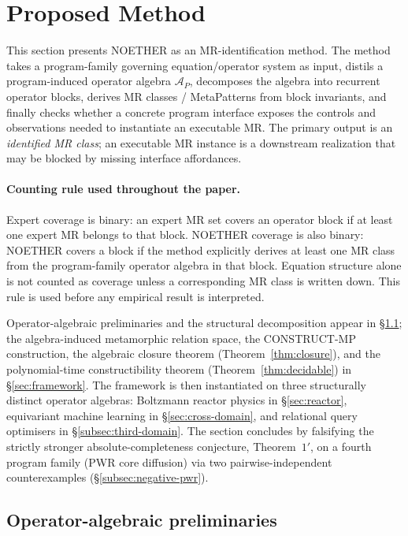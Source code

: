 \documentclass[manuscript]{acmart}
\begin{document}
\section{Proposed Method}
\label{sec:noether-framework}

This section presents NOETHER as an MR-identification method. The method takes a program-family governing equation/operator system as input, distils a program-induced operator algebra $\mathcal{A}_P$, decomposes the algebra into recurrent operator blocks, derives MR classes / MetaPatterns from block invariants, and finally checks whether a concrete program interface exposes the controls and observations needed to instantiate an executable MR. The primary output is an \emph{identified MR class}; an executable MR instance is a downstream realization that may be blocked by missing interface affordances.

\paragraph{Counting rule used throughout the paper.}
Expert coverage is binary: an expert MR set covers an operator block if at least one expert MR belongs to that block. NOETHER coverage is also binary: NOETHER covers a block if the method explicitly derives at least one MR class from the program-family operator algebra in that block. Equation structure alone is not counted as coverage unless a corresponding MR class is written down. This rule is used before any empirical result is interpreted.

Operator-algebraic preliminaries and the structural decomposition appear in \S\ref{sec:prelim}; the algebra-induced metamorphic relation space, the CONSTRUCT-MP construction, the algebraic closure theorem (Theorem~\ref{thm:closure}), and the polynomial-time constructibility theorem (Theorem~\ref{thm:decidable}) in \S\ref{sec:framework}. The framework is then instantiated on three structurally distinct operator algebras: Boltzmann reactor physics in \S\ref{sec:reactor}, equivariant machine learning in \S\ref{sec:cross-domain}, and relational query optimisers in \S\ref{subsec:third-domain}. The section concludes by falsifying the strictly stronger absolute-completeness conjecture, Theorem~$1'$, on a fourth program family (PWR core diffusion) via two pairwise-independent counterexamples (\S\ref{subsec:negative-pwr}).

\subsection{Operator-algebraic preliminaries}
\label{sec:prelim}
\end{document}
